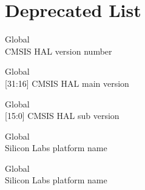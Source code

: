\chapter{Deprecated List}
\hypertarget{deprecated}{}\label{deprecated}

\begin{DoxyRefList}
\item[Global \doxylink{core__cm3_8h_af888c651cd8c93fd25364f9e74306a1c}{\+\_\+\+\_\+\+CM3\+\_\+\+CMSIS\+\_\+\+VERSION} ]\hfill \\
\label{deprecated__deprecated000003}%
%
CMSIS HAL version number  
\item[Global \doxylink{core__cm3_8h_ac1c1120e9fe082fac8225c60143ac79a}{\+\_\+\+\_\+\+CM3\+\_\+\+CMSIS\+\_\+\+VERSION\+\_\+\+MAIN} ]\hfill \\
\label{deprecated__deprecated000001}%
%
\mbox{[}31\+:16\mbox{]} CMSIS HAL main version  
\item[Global \doxylink{core__cm3_8h_a9ff7a998d4b8b3c87bfaca6e78607950}{\+\_\+\+\_\+\+CM3\+\_\+\+CMSIS\+\_\+\+VERSION\+\_\+\+SUB} ]\hfill \\
\label{deprecated__deprecated000002}%
%
\mbox{[}15\+:0\mbox{]} CMSIS HAL sub version  
\item[Global \doxylink{group___e_f_m32_g_g990_f1024___part_ga9a2185e66f1c6a74956fcbaa182401b5}{\+\_\+\+SILICON\+\_\+\+LABS\+\_\+32\+B\+\_\+\+PLATFORM} ]\hfill \\
\label{deprecated__deprecated000005}%
%
Silicon Labs platform name  
\item[Global \doxylink{group___e_f_m32_g_g990_f1024___part_gadfe7757d548718f80cc349d4c7911ad1}{\+\_\+\+SILICON\+\_\+\+LABS\+\_\+32\+B\+\_\+\+PLATFORM\+\_\+1} ]\hfill \\
\label{deprecated__deprecated000004}%
%
Silicon Labs platform name 
\end{DoxyRefList}
